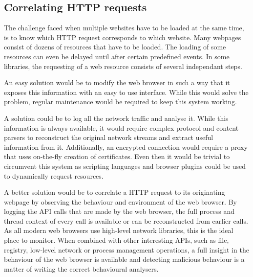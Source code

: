 \subsection{Correlating HTTP requests}


The challenge faced when multiple websites have to be loaded at the same time, is to know which HTTP request corresponds to which website. Many webpages consist of dozens of resources that have to be loaded. The loading of some resources can even be delayed until after certain predefined events. In some libraries, the requesting of a web resource consists of several independant steps.

An easy solution would be to modify the web browser in such a way that it exposes this information with an easy to use interface. While this would solve the problem, regular maintenance would be required to keep this system working. 

A solution could be to log all the network traffic and analyse it. While this information is always available, it would require complex protocol and content parsers to reconstruct the original network streams and extract useful information from it. Additionally, an encrypted connection would require a proxy that uses on-the-fly creation of certificates. Even then it would be trivial to circumvent this system as scripting languages and browser plugins could be used to dynamically request resources.

A better solution would be to correlate a HTTP request to its originating webpage by observing the behaviour and environment of the web browser. By logging the API calls that are made by the web browser, the full process and thread context of every call is available or can be reconstructed from earlier calls. As all modern web browsers use high-level network libraries, this is the ideal place to monitor. When combined with other interesting APIs, such as file, registry, low-level network or process management operations, a full insight in the behaviour of the web browser is available and detecting malicious behaviour is a matter of writing the correct behavioural analysers.

